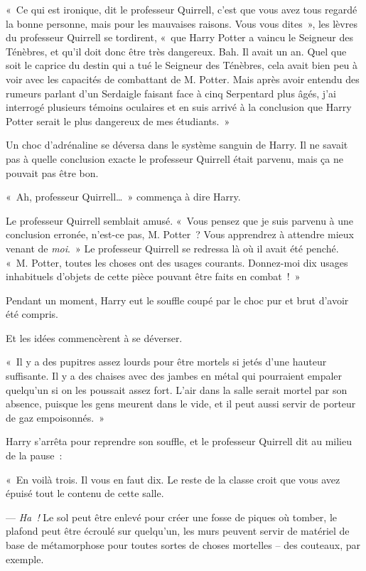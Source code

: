 «~Ce qui est ironique, dit le professeur Quirrell, c'est que vous avez tous regardé la bonne personne, mais pour les mauvaises raisons. Vous vous dites~», les lèvres du professeur Quirrell se tordirent, «~que Harry Potter a vaincu le Seigneur des Ténèbres, et qu'il doit donc être très dangereux. Bah. Il avait un an. Quel que soit le caprice du destin qui a tué le Seigneur des Ténèbres, cela avait bien peu à voir avec les capacités de combattant de M. Potter. Mais après avoir entendu des rumeurs parlant d'un Serdaigle faisant face à cinq Serpentard plus âgés, j'ai interrogé plusieurs témoins oculaires et en suis arrivé à la conclusion que Harry Potter serait le plus dangereux de mes étudiants.~»

Un choc d'adrénaline se déversa dans le système sanguin de Harry. Il ne savait pas à quelle conclusion exacte le professeur Quirrell était parvenu, mais ça ne pouvait pas être bon.

«~Ah, professeur Quirrell…~» commença à dire Harry.

Le professeur Quirrell semblait amusé. «~Vous pensez que je suis parvenu à une conclusion erronée, n'est-ce pas, M. Potter~? Vous apprendrez à attendre mieux venant de \emph{moi}.~» Le professeur Quirrell se redressa là où il avait été penché. «~M. Potter, toutes les choses ont des usages courants. Donnez-moi dix usages inhabituels d'objets de cette pièce pouvant être faits en combat~!~»

Pendant un moment, Harry eut le souffle coupé par le choc pur et brut d'avoir été compris.

Et les idées commencèrent à se déverser.

«~Il y a des pupitres assez lourds pour être mortels si jetés d'une hauteur suffisante. Il y a des chaises avec des jambes en métal qui pourraient empaler quelqu'un si on les poussait assez fort. L'air dans la salle serait mortel par son absence, puisque les gens meurent dans le vide, et il peut aussi servir de porteur de gaz empoisonnés.~»

Harry s'arrêta pour reprendre son souffle, et le professeur Quirrell dit au milieu de la pause~:

«~En voilà trois. Il vous en faut dix. Le reste de la classe croit que vous avez épuisé tout le contenu de cette salle.

--- \emph{Ha~!} Le sol peut être enlevé pour créer une fosse de piques où tomber, le plafond peut être écroulé sur quelqu'un, les murs peuvent servir de matériel de base de métamorphose pour toutes sortes de choses mortelles -- des couteaux, par exemple.

